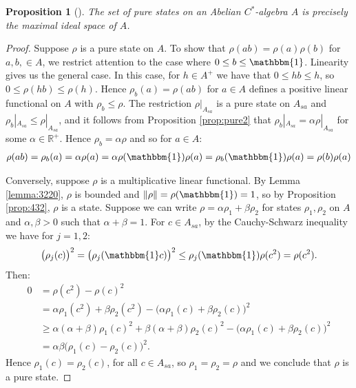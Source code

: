 \documentclass[11pt,a4paper]{report}
\theoremstyle{plain}
\newtheorem{prop}{Proposition}
\theoremstyle{definition}
\newcommand{\1}{\mathbbm{1}}
\newcommand{\R}{\mathbb{R}}
\begin{document}
\begin{prop}[{\cite[4.4.1]{kadison83}}]\label{prop:puremult}
	The set of pure states on an Abelian $C^\ast$-algebra $A$ is precisely the maximal ideal space of 
	$A$.
\end{prop}
\begin{proof}
	Suppose $\rho$ is a pure state on $A$. To show that $\rho(ab)=\rho(a)\rho(b)$ for $a,b,\in A$,
	we restrict attention to the case where $0\leq b\leq\1$. Linearity gives us the general case.
	In this case, for $h\in A^+$ we have that $0\leq hb\leq h$, so $0\leq\rho(hb)\leq\rho(h)$.
	Hence $\rho_b(a)=\rho(ab)$ for $a\in A$ defines a positive linear functional on $A$ with 
	$\rho_b\leq\rho$. The restriction $\rho|_{A_{sa}}$ is a pure state on $A_{sa}$ and 
	$\rho_b|_{A_{sa}} \leq \rho|_{A_{sa}}$, and it follows from Proposition \ref{prop:pure2} that 
	$\rho_b|_{A_{sa}} = \alpha \rho|_{A_{sa}}$ for some $\alpha \in \R^+$.
	Hence $\rho_b = \alpha\rho$  and so for $a\in A$:
	\begin{align*}
		\rho(ab) = \rho_b(a) = \alpha\rho(a) = 
							\alpha\rho(\1)\rho(a) = \rho_b(\1)\rho(a) = \rho(b)\rho(a)
	\end{align*}
	
	Conversely, suppose $\rho$ is a multiplicative linear functional. By Lemma \ref{lemma:3220}, $
	\rho$ is bounded and $\left\|\rho\right\|=\rho(\1)=1$, so by Proposition \ref{prop:432}, $\rho$ is a state.
	Suppose we can write $\rho=\alpha\rho_1+\beta\rho_2$ for states $\rho_1,\rho_2$ on $A$ and 
	$\alpha,\beta >0$ such that $\alpha+\beta=1$. For $c\in A_{sa}$, by the Cauchy-Schwarz inequality
	 we have for $j=1,2$:
	\begin{align*}
		\big(\rho_j(c)\big)^2 = \big(\rho_j(\1 c)\big)^2 \leq \rho_j(\1)\rho(c^2)=\rho(c^2).
	\end{align*}
	Then:
	\begin{align*}
				0
		&=		\rho(c^2)-\rho(c)^2 											\\
		&=		\alpha\rho_1(c^2)+\beta\rho_2(c^2) 
						- \big(\alpha\rho_1(c)+\beta\rho_2(c)\big)^2			\\
		&\geq	\alpha(\alpha+\beta)\rho_1(c)^2 
						+ \beta(\alpha+\beta)\rho_2(c)^2
						- \big(\alpha\rho_1(c)+\beta\rho_2(c)\big)^2			\\
		&=		\alpha\beta\big(\rho_1(c) - \rho_2(c)\big)^2.
	\end{align*}
	Hence $\rho_1(c)=\rho_2(c)$, for all $c\in A_{sa}$, so $\rho_1=\rho_2 =\rho$ and we conclude
	that $\rho$ is a pure state. 
\end{proof}
\end{document}
